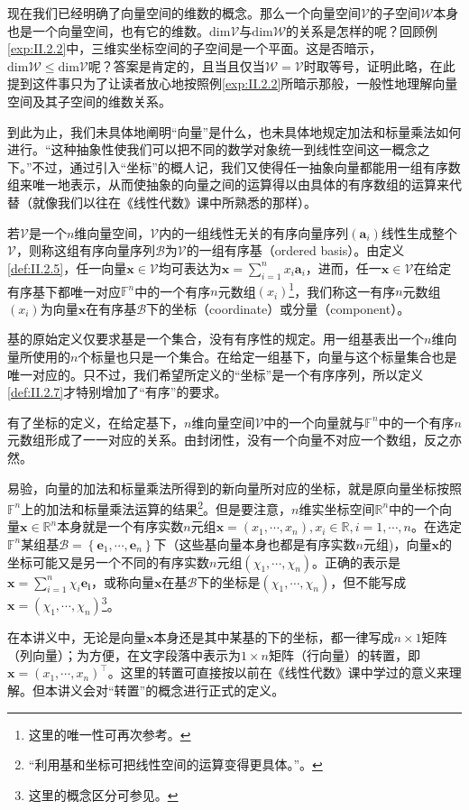 \documentclass[main.tex]{subfiles}
\begin{document}
现在我们已经明确了向量空间的维数的概念。那么一个向量空间$\mathcal{V}$的子空间$\mathcal{W}$本身也是一个向量空间，也有它的维数。$\mathrm{dim}\mathcal{V}$与$\mathrm{dim}\mathcal{W}$的关系是怎样的呢？回顾例\ref{exp:II.2.2}中，三维实坐标空间的子空间是一个平面。这是否暗示，$\mathrm{dim}\mathcal{W}\leq\mathrm{dim}\mathcal{V}$呢？答案是肯定的，且当且仅当$\mathcal{W}=\mathcal{V}$时取等号，证明此略，在此提到这件事只为了让读者放心地按照例\ref{exp:II.2.2}所暗示那般，一般性地理解向量空间及其子空间的维数关系。

到此为止，我们未具体地阐明“向量”是什么，也未具体地规定加法和标量乘法如何进行。“这种抽象性使我们可以把不同的数学对象统一到线性空间这一概念之下。”\cite[p.~167]{周胜林2012线性代数}不过，通过引入“坐标”的概人记，我们又使得任一抽象向量都能用一组有序数组来唯一地表示，从而使抽象的向量之间的运算得以由具体的有序数组的运算来代替（就像我们以往在《线性代数》课中所熟悉的那样）。

\begin{definition}[向量在给定有序基下的坐标]\label{def:II.2.7}若$\mathcal{V}$是一个$n$维向量空间，$\mathcal{V}$内的一组线性无关的有序向量序列$\left(\mathbf{a}_i\right)$线性生成整个$\mathcal{V}$，则称这组有序向量序列$\mathcal{B}$为$\mathcal{V}$的一组有序基（ordered basis）。由定义\ref{def:II.2.5}，任一向量$\mathbf{x}\in\mathcal{V}$均可表达为$\mathbf{x}=\sum_{i=1}^nx_i\mathbf{a}_i$，进而，任一$\mathbf{x}\in\mathcal{V}$在给定有序基下都唯一对应$\mathbb{F}^n$中的一个有序$n$元数组$\left(x_i\right)$\footnote{这里的唯一性可再次参考\cite[“(3)的证明”，p.~171]{周胜林2012线性代数}。}，我们称这一有序$n$元数组$\left(x_i\right)$为向量$\mathbf{x}$在有序基$\mathcal{B}$下的坐标（coordinate）或分量（component）。
\end{definition}

基的原始定义仅要求基是一个集合，没有有序性的规定。用一组基表出一个$n$维向量所使用的$n$个标量也只是一个集合。在给定一组基下，向量与这个标量集合也是唯一对应的。只不过，我们希望所定义的“坐标”是一个有序序列，所以定义\ref{def:II.2.7}才特别增加了“有序”的要求。

有了坐标的定义，在给定基下，$n$维向量空间$\mathcal{V}$中的一个向量就与$\mathbb{F}^n$中的一个有序$n$元数组形成了一一对应的关系。由封闭性，没有一个向量不对应一个数组，反之亦然。

易验，向量的加法和标量乘法所得到的新向量所对应的坐标，就是原向量坐标按照$\mathbb{F}^n$上的加法和标量乘法运算的结果\footnote{“利用基和坐标可把线性空间的运算变得更具体。”\cite[p.173]{周胜林2012线性代数}。}。但是要注意，$n$维实坐标空间$\mathbb{R}^n$中的一个向量$\mathbf{x}\in\mathbb{R}^n$本身就是一个有序实数$n$元组$\mathbf{x}=\left(x_1,\cdots,x_n\right),x_i\in\mathbb{R},i=1,\cdots,n$。在选定$\mathbb{F}^n$某组基$\mathcal{B}=\left\{\mathbf{e}_1,\cdots,\mathbf{e}_n\right\}$下（这些基向量本身也都是有序实数$n$元组)，向量$\mathbf{x}$的坐标可能又是另一个不同的有序实数$n$元组$\left(\chi_1,\cdots,\chi_n\right)$。正确的表示是$\mathbf{x}=\sum_{i=1}^{n}\chi_i\mathbf{e_i}$，或称向量$\mathbf{x}$在基$\mathcal{B}$下的坐标是$\left(\chi_1,\cdots,\chi_n\right)$，但不能写成$\mathbf{x}=\left(\chi_1,\cdots,\chi_n\right)$\footnote{这里的概念区分可参见\cite[例题2.1,p.~173]{周胜林2012线性代数}。}。

在本讲义中，无论是向量$\mathbf{x}$本身还是其中某基的下的坐标，都一律写成$n\times 1$矩阵（列向量）；为方便，在文字段落中表示为$1\times n$矩阵（行向量）的转置，即$\mathbf{x}=\left(x_1,\cdots,x_n\right)^\intercal$。这里的转置可直接按以前在《线性代数》课中学过的意义来理解。但本讲义会对“转置”的概念进行正式的定义。
\end{document}
